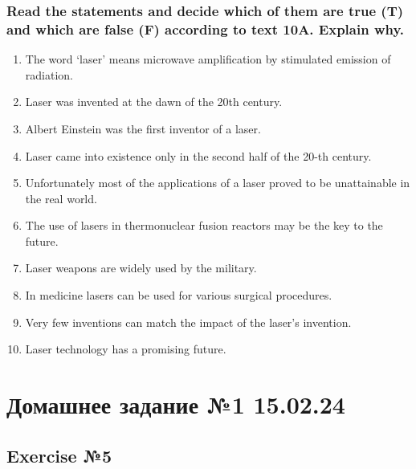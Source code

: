 \subsection*{Read the statements and decide which of them are true (T) and
      which are false (F) according to text 10A. Explain why.}
\begin{enumerate}
      \item The word ‘laser’ means microwave amplification by stimulated emission
            of radiation.
      \item Laser was invented at the dawn of the 20th century.
      \item Albert Einstein was the first inventor of a laser.
      \item Laser came into existence only in the second half of the 20-th century.
      \item Unfortunately most of the applications of a laser proved to be unattainable
            in the real world.
      \item The use of lasers in thermonuclear fusion reactors may be the key
            to the future.
      \item Laser weapons are widely used by the military.
      \item In medicine lasers can be used for various surgical procedures.
      \item Very few inventions can match the impact of the laser’s invention.
      \item Laser technology has a promising future.
\end{enumerate}

\chapter{Домашнее задание №1 15.02.24}

\section{Exercise №5}

